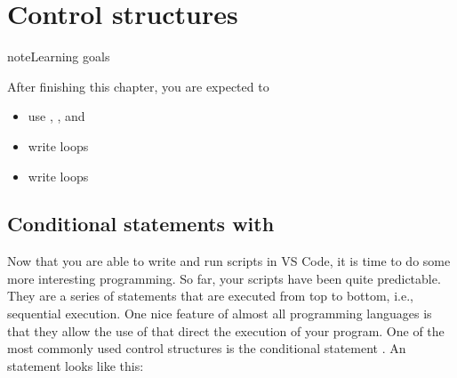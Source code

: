 \documentclass[letterpaper,10pt,english]{jupyterBook}
\begin{document}
\sphinxstepscope


\chapter{Control structures}
\label{\detokenize{notebooks/03_ControlStructures/03_ControlStructures_student:control-structures}}\label{\detokenize{notebooks/03_ControlStructures/03_ControlStructures_student::doc}}
\begin{sphinxadmonition}{note}{Learning goals}

\sphinxAtStartPar
After finishing this chapter, you are expected to
\begin{itemize}
\item {} 
\sphinxAtStartPar
use , , and 

\item {} 
\sphinxAtStartPar
write  loops

\item {} 
\sphinxAtStartPar
write  loops

\end{itemize}
\end{sphinxadmonition}


\section{Conditional statements with }
\label{\detokenize{notebooks/03_ControlStructures/03_ControlStructures_student:conditional-statements-with-if}}
\sphinxAtStartPar
Now that you are able to write and run scripts in VS Code, it is time to do some more interesting programming. So far, your scripts have been quite predictable. They are a series of statements that are executed from top to bottom, i.e., sequential execution. One nice feature of almost all programming languages is that they allow the use of  that direct the execution of your program. One of the most commonly used control structures is the conditional statement . An  statement looks like this:

\begin{sphinxVerbatim}[commandchars=\\\{\}]
 
\end{sphinxVerbatim}
\end{document}

